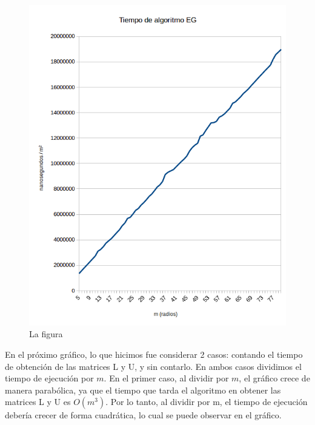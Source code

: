 \begin{figure}[h]
  \center
  \includegraphics[scale=0.8]{imagenes/tiempoEGdivididoM2.png}
  \caption{La figura}
  \label{fig:egdivididom2}
\end{figure}

En el próximo gráfico, lo que hicimos fue considerar 2 casos: contando el tiempo de obtención de las matrices L y U, y sin contarlo. En ambos casos dividimos el tiempo de ejecución por $m$. En el primer caso, al dividir por $m$, el gráfico crece de manera parabólica, ya que el tiempo que tarda el algoritmo en obtener las matrices L y U es $O(m^{3})$. Por lo tanto, al dividir por m, el tiempo de ejecución debería crecer de forma cuadrática, lo cual se puede observar en el gráfico. 


